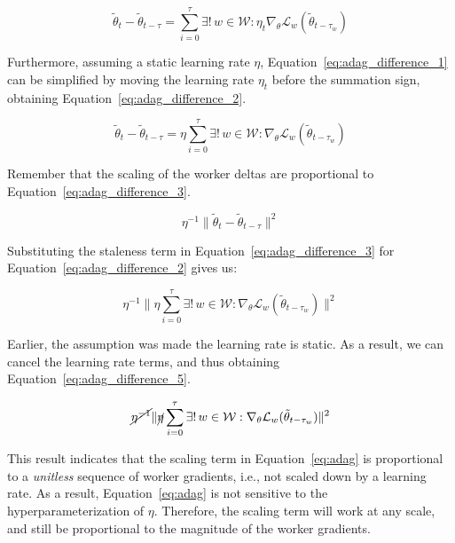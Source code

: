 \begin{equation}
  \label{eq:adag_difference_1}
  \tilde{\theta}_{t} - \tilde{\theta}_{t - \tau} = \sum_{i = 0}^\tau \exists!\, w \in \mathcal{W}: \eta_t \nabla_\theta \mathcal{L}_w(\tilde{\theta}_{t - \tau_w})
\end{equation}

Furthermore, assuming a static learning rate $\eta$, Equation~\ref{eq:adag_difference_1} can be simplified by moving the learning rate $\eta_t$ before the summation sign, obtaining Equation~\ref{eq:adag_difference_2}.

\begin{equation}
  \label{eq:adag_difference_2}
  \tilde{\theta}_{t} - \tilde{\theta}_{t - \tau} = \eta \sum_{i = 0}^\tau \exists!\, w \in \mathcal{W}: \nabla_\theta \mathcal{L}_w(\tilde{\theta}_{t - \tau_w})
\end{equation}

Remember that the scaling of the worker deltas are proportional to Equation~\ref{eq:adag_difference_3}.

\begin{equation}
  \label{eq:adag_difference_3}
  \eta^{-1} \|\tilde{\theta}_t - \tilde{\theta}_{t - \tau}\|^2
\end{equation}

Substituting the staleness term in Equation~\ref{eq:adag_difference_3} for Equation~\ref{eq:adag_difference_2} gives us:

\begin{equation}
  \label{eq:adag_difference_4}
  \eta^{-1}\|\eta\sum_{i = 0}^\tau \exists!\, w \in \mathcal{W}: \nabla_\theta \mathcal{L}_w(\tilde{\theta}_{t - \tau_w})\|^2
\end{equation}

Earlier, the assumption was made the learning rate is static. As a result, we can cancel the learning rate terms, and thus obtaining Equation~\ref{eq:adag_difference_5}.

\begin{equation}
  \label{eq:adag_difference_5}
  \cancel{\eta^{-1}}\|\cancel{\eta}\sum_{i = 0}^\tau \exists!\, w \in \mathcal{W}: \nabla_\theta \mathcal{L}_w(\tilde{\theta}_{t - \tau_w})\|^2
\end{equation}

This result indicates that the scaling term in Equation~\ref{eq:adag} is proportional to a \emph{unitless} sequence of worker gradients, i.e., not scaled down by a learning rate. As a result, Equation~\ref{eq:adag} is not sensitive to the hyperparameterization of $\eta$. Therefore, the scaling term will work at any scale, and still be proportional to the magnitude of the worker gradients.\\

